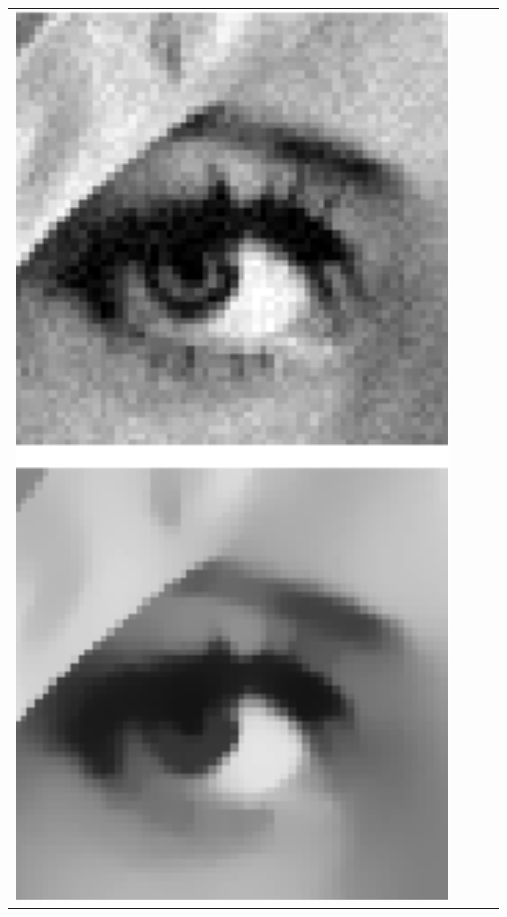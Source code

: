 \documentclass{book}
\begin{document}
\begin{center}
\begin{tabular}{|c|c|c|c|}
        \includegraphics[scale=0.25]{chapter 8/ch8_figure3.jpeg} & 

\end{tabular}
\end{center}
\end{document}
